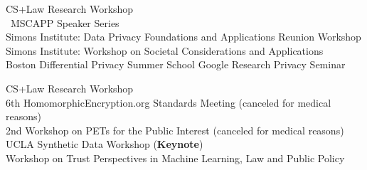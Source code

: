 \begin{itemize}[label={}]
%
{CS+Law Research Workshop \\
\UChicago~MSCAPP Speaker Series \\
Simons Institute: Data Privacy Foundations and Applications Reunion Workshop \\
Simons Institute: Workshop on Societal Considerations and Applications \\
Boston Differential Privacy Summer School
Google Research Privacy Seminar}

%
{CS+Law Research Workshop\\
6th HomomorphicEncryption.org Standards Meeting (canceled for medical reasons)\\%
2nd Workshop on PETs for the Public Interest (canceled for medical reasons) \\%
UCLA Synthetic Data Workshop (\textbf{Keynote}) \\ %
Workshop on Trust Perspectives in Machine Learning, Law and Public Policy\\ %
}


\end{itemize}
